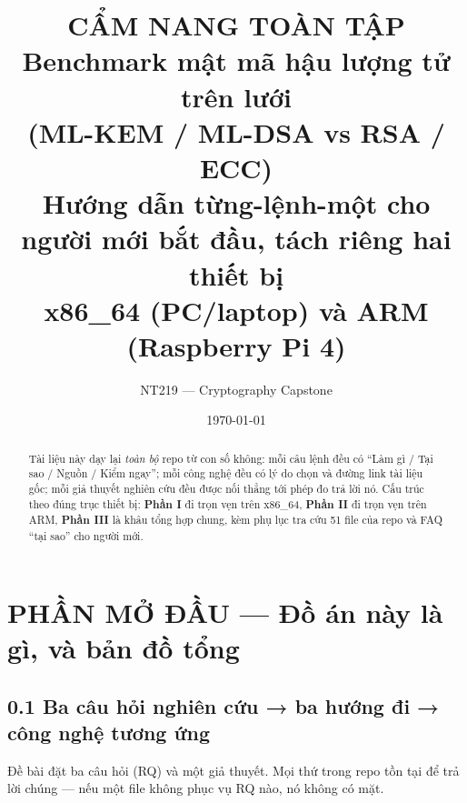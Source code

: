 \documentclass[11pt,a4paper]{article}
\title{\textbf{CẨM NANG TOÀN TẬP\\Benchmark mật mã hậu lượng tử trên lưới\\(ML-KEM / ML-DSA vs RSA / ECC)}\\
\large Hướng dẫn từng-lệnh-một cho người mới bắt đầu, tách riêng hai thiết bị\\x86\_64 (PC/laptop) và ARM (Raspberry Pi 4)}
\author{NT219 — Cryptography Capstone}
\date{\today}
\begin{document}
\maketitle
\begin{abstract}
Tài liệu này dạy lại \emph{toàn bộ} repo từ con số không: mỗi câu lệnh đều có ``Làm gì / Tại sao / Nguồn / Kiểm ngay''; mỗi công nghệ đều có lý do chọn và đường link tài liệu gốc; mỗi giả thuyết nghiên cứu đều được nối thẳng tới phép đo trả lời nó. Cấu trúc theo đúng trục thiết bị: \textbf{Phần I} đi trọn vẹn trên x86\_64, \textbf{Phần II} đi trọn vẹn trên ARM, \textbf{Phần III} là khâu tổng hợp chung, kèm phụ lục tra cứu 51 file của repo và FAQ ``tại sao'' cho người mới.
\end{abstract}
\tableofcontents
\newpage

\section*{PHẦN MỞ ĐẦU — Đồ án này là gì, và bản đồ tổng}

\subsection*{0.1 Ba câu hỏi nghiên cứu → ba hướng đi → công nghệ tương ứng}
Đề bài đặt ba câu hỏi (RQ) và một giả thuyết. Mọi thứ trong repo tồn tại để trả lời chúng — nếu một file không phục vụ RQ nào, nó không có mặt.
\end{document}

